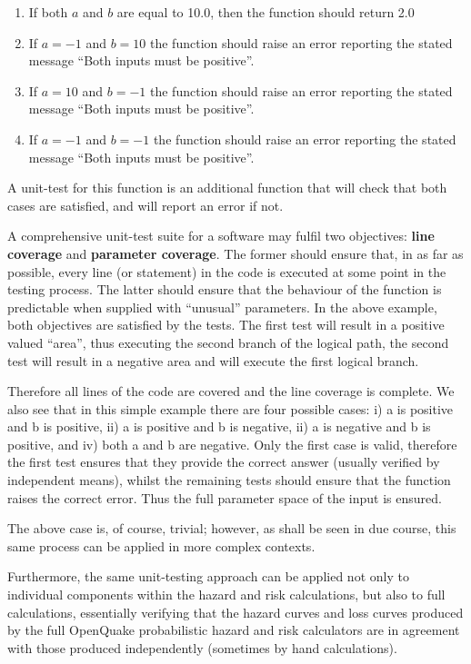 \begin{enumerate}
\item If both $a$ and $b$ are equal to 10.0, then the function     should return 2.0
\item If $a = -1$ and $b = 10$ the function should raise an error     reporting the stated message ``Both inputs must be positive''.
\item If $a = 10$ and $b = -1$ the function should raise an error     reporting the stated message ``Both inputs must be positive''.
\item If $a = -1$ and $b = -1$ the function should raise an error     reporting the stated message ``Both inputs must be positive''.
\end{enumerate}

A unit-test for this function is an additional function that will check that both cases are satisfied, and will report an error if not.

A comprehensive unit-test suite for a software may fulfil two objectives: \textbf{line coverage} and \textbf{parameter coverage}. The former should ensure that, in as far as possible, every line (or statement) in the code is executed at some point in the testing process. The latter should ensure that the behaviour of the function is predictable when supplied with ``unusual'' parameters. In the above example, both objectives are satisfied by the tests. The first test will result in a positive valued ``area'', thus executing the second branch of the logical path, the second test will result in a negative area and will execute the first logical branch. %

Therefore all lines of the code are covered and the line coverage is complete. We also see that in this simple example there are four possible cases: i) a is positive and b is positive, ii) a is positive and b is negative, ii) a is negative and b is positive, and iv) both a and b are negative. Only the first case is valid, therefore the first test ensures that they provide the correct answer (usually verified by independent means), whilst the remaining tests should ensure that the function raises the correct error. Thus the full parameter space of the input is ensured.

The above case is, of course, trivial; however, as shall be seen in due course, this same process can be applied in more complex contexts.

Furthermore, the same unit-testing approach can be applied not only to individual components within the hazard and risk calculations, but also to full calculations, essentially verifying that the hazard curves and loss curves produced by the full OpenQuake probabilistic hazard and risk calculators are in agreement with those produced independently (sometimes by hand calculations).

